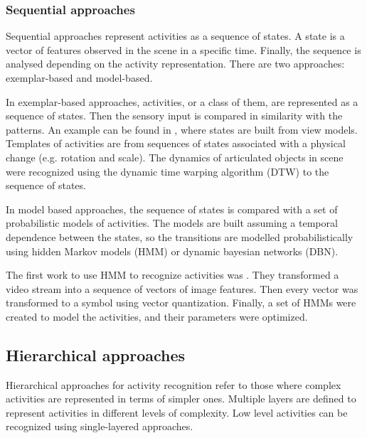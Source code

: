 \documentclass[a4paper, 12pt, openany, oneside]{book}
\begin{document}
\subsubsection{Sequential approaches} %

Sequential approaches represent activities as a sequence of states. 
A state is a vector of features observed in the scene in a specific time.
Finally, the sequence is analysed depending on the activity representation.
There are two approaches: exemplar-based and model-based.

In exemplar-based approaches, activities, or a class of them, are represented as a sequence of states. 
Then the sensory input is compared in similarity with the patterns.
An example can be found in \citep{Darrell1993_STGestures}, where states are built from view models.
Templates of activities are from sequences of states associated with a physical change (e.g. rotation and scale).
The dynamics of articulated objects in scene were recognized using the dynamic time warping algorithm (DTW) to the sequence of states.

In model based approaches, the sequence of states is compared with a set of probabilistic models of activities. The models are built assuming a temporal dependence between the states, so the transitions are modelled probabilistically using hidden Markov models (HMM) or dynamic bayesian networks (DBN).

The first work to use HMM to recognize activities was \citep{Yamato1992_RecHA_HMM}. They transformed a video stream into a sequence of vectors of image features. Then every vector was transformed to a symbol using vector quantization. Finally, a set of HMMs were created to model the activities, and their parameters were optimized. 



\subsection{Hierarchical approaches}
Hierarchical approaches for activity recognition refer to those where complex activities are represented in terms of simpler ones. 
Multiple layers are defined to represent activities in different levels of complexity.
Low level activities can be recognized using single-layered approaches. 
\end{document}

